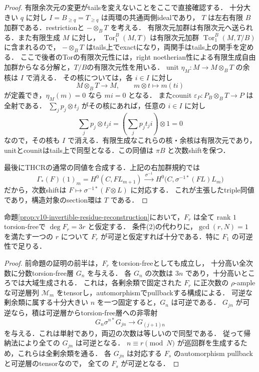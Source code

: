 \documentclass[11pt,a4paper]{ltjsarticle}
\begin{document}
\begin{proof}
有限余次元の変更がtailsを変えないことをここで直接確認する．
十分大きい $q$ に対し $I=B_{\ge q}=T_{\ge q}$ は両環の共通両側idealであり，
$T$ は左右有限 $B$ 加群である．restrictionと $-\otimes_B T$ を考える．
有限次元加群は有限次元へ送られる．また有限生成 $M$ に対し，
$\operatorname{Tor}_1^B(M,T)$ は有限次元加群 $\operatorname{Tor}_1^B(M,T/B)$ に含まれるので，
$-\otimes_B T$ はtails上でexactになり，両関手はtails上の関手を定める．
ここで後者のTorの有限次元性には，right noetherian性による有限生成自由加群からなる分解と，$T/B$の有限次元性を用いる．
unit $\eta_M:M\to M\otimes_B T$ の余核は $I$ で消える．
その核については，各 $i\in I$ に対し
\[
 M\otimes_B T\longrightarrow M,\qquad m\otimes t\longmapsto m(ti)
\]
が定義でき，$\eta_M(m)=0$ なら $mi=0$ となる．
またcounit $\varepsilon_P:P_B\otimes_B T\to P$ は全射である．
$\sum_jp_j\otimes t_j$ がその核にあれば，任意の $i\in I$ に対し
\[
 \sum_jp_j\otimes t_ji
 =\left(\sum_jp_jt_ji\right)\otimes1=0
\]
なので，その核も $I$ で消える．有限生成なこれらの核・余核は有限次元であり，
unitとcounitはtails上で同型となる．この同値は $\pi B$ と次数shiftを保つ．

最後にTHCRの通常の同値を合成する．上記の右加群規約では
\[
 \Gamma_*(F)(1)_m=H^0(C,F L_{m+1})
 \xrightarrow{\ \sigma^{-1}\ }
 H^0\bigl(C,\sigma^{-1*}(F L)L_m\bigr)
\]
だから，次数shiftは $F\mapsto\sigma^{-1*}(F\otimes L)$ に対応する．
これが主張したtriple同値であり，構造対象のsection環は $T$ である．
\end{proof}

\begin{lemma}[一つの原始剰余類の可逆性で十分]
\label{lem:v10-one-invertible-residue}
命題\ref{prop:v10-invertible-residue-reconstruction}において，$F_r$ は全て
rank $1$ torsion-freeで $\deg F_r=3r$ と仮定する．
条件(2)の代わりに，$\gcd(r,N)=1$ を満たす一つの $r$ について
$F_r$ が可逆と仮定すれば十分である．特に $F_1$ の可逆性で足りる．
\end{lemma}
\begin{proof}
前命題の証明の前半は，$F_r$ をtorsion-freeとしても成立し，
十分高い全次数に分数torsion-free層 $G_n$ を与える．
各 $G_n$ の次数は $3n$ であり，十分高いところでは大域生成される．
これは，各剰余類で固定された $F_r$ に正次数の $\rho$-ampleな可逆層列 $\mathcal M_m$ をtensorし，automorphismでpullbackする構成による．
可逆な剰余類に属する十分大きい $n$ を一つ固定すると，$G_n$ は可逆である．
$G_{jn}$ が可逆なら，積は可逆層からtorsion-free層への非零射
\[
 G_n\sigma^{n*}G_{jn}\longrightarrow G_{(j+1)n}
\]
を与える．これは単射であり，両辺の次数は等しいので同型である．
従って帰納法により全ての $G_{jn}$ は可逆となる．
$n\equiv r\pmod N$ が巡回群を生成するため，これらは全剰余類を通る．
各 $G_{jn}$ は対応する $F_s$ のautomorphism pullbackと可逆層のtensorなので，
全ての $F_s$ が可逆となる．
\end{proof}
\end{document}
